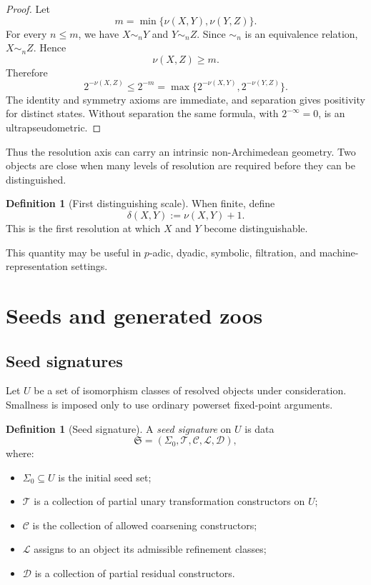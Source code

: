 \documentclass[11pt]{article}
\theoremstyle{definition}
\newtheorem{definition}[theorem]{Definition}
\theoremstyle{remark}
\newcommand{\Seeds}{\Sigma}
\begin{document}
\begin{proof}
Let
\[
m=\min\{\nu(X,Y),\nu(Y,Z)\}.
\]
For every $n\le m$, we have $X\sim_nY$ and $Y\sim_nZ$. Since $\sim_n$ is an equivalence relation, $X\sim_nZ$. Hence
\[
\nu(X,Z)\ge m.
\]
Therefore
\[
2^{-\nu(X,Z)}
\le
2^{-m}
=
\max\{2^{-\nu(X,Y)},2^{-\nu(Y,Z)}\}.
\]
The identity and symmetry axioms are immediate, and separation gives positivity for distinct states. Without separation the same formula, with $2^{-\infty}=0$, is an ultrapseudometric.
\end{proof}

Thus the resolution axis can carry an intrinsic non-Archimedean geometry. Two objects are close when many levels of resolution are required before they can be distinguished.

\begin{definition}[First distinguishing scale]
When finite, define
\[
\delta(X,Y):=\nu(X,Y)+1.
\]
This is the first resolution at which $X$ and $Y$ become distinguishable.
\end{definition}

This quantity may be useful in $p$-adic, dyadic, symbolic, filtration, and machine-representation settings.

\section{Seeds and generated zoos}

\subsection{Seed signatures}

Let $U$ be a set of isomorphism classes of resolved objects under consideration. Smallness is imposed only to use ordinary powerset fixed-point arguments.

\begin{definition}[Seed signature]
A \emph{seed signature} on $U$ is data
\[
\mathfrak S=(\Seeds_0,\mathscr T,\mathscr C,\mathscr L,\mathscr D),
\]
where:
\begin{itemize}
    \item $\Seeds_0\subseteq U$ is the initial seed set;
    \item $\mathscr T$ is a collection of partial unary transformation constructors on $U$;
    \item $\mathscr C$ is the collection of allowed coarsening constructors;
    \item $\mathscr L$ assigns to an object its admissible refinement classes;
    \item $\mathscr D$ is a collection of partial residual constructors.
\end{itemize}
\end{definition}
\end{document}
